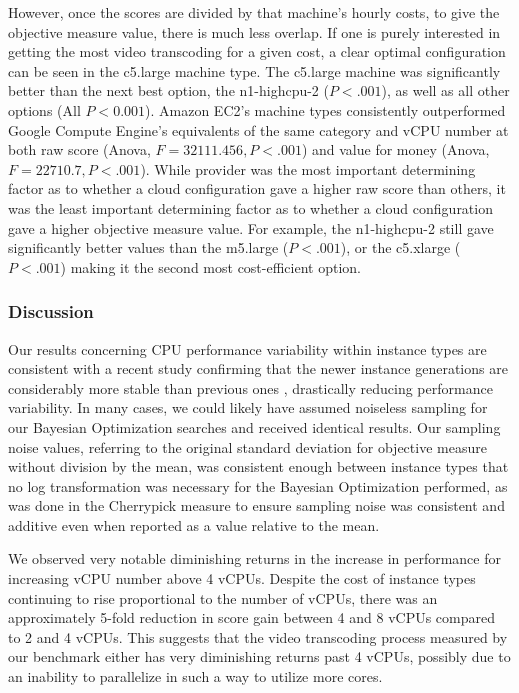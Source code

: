 \documentclass{report}
\begin{document}
However, once the scores are divided by that machine's hourly costs, to give the objective measure value, there is much less overlap. If one is purely interested in getting the most video transcoding for a given cost, a clear optimal configuration can be seen in the c5.large machine type. The c5.large machine was significantly better than the next best option, the n1-highcpu-2 ($P < .001$), as well as all other options (All $P < 0.001$). Amazon EC2's  machine types consistently outperformed Google Compute Engine's equivalents of the same category and vCPU number at both raw score (Anova, $F = 32111.456, P < .001$) and value for money (Anova, $F = 22710.7, P < .001$). While provider was the most important determining factor as to whether a cloud configuration gave a higher raw score than others, it was the least important determining factor as to whether a cloud configuration gave a higher objective measure value. For example, the n1-highcpu-2 still gave significantly better values than the m5.large ($P < .001$), or the c5.xlarge ($P < .001$) making it the second most cost-efficient option. 


\subsubsection{Discussion}
Our results concerning CPU performance variability within instance types are consistent with a recent study \cite{Scheuner2018} confirming that the newer instance generations are considerably more stable than previous ones \cite{Leitner2014}, drastically reducing performance variability. In many cases, we could likely have assumed noiseless sampling for our Bayesian Optimization searches and received identical results. Our sampling noise values, referring to the original standard deviation for objective measure without division by the mean, was consistent enough between instance types that no log transformation was necessary for the Bayesian Optimization performed, as was done in the Cherrypick measure to ensure sampling noise was consistent and additive even when reported as a value relative to the mean\cite{Alipourfard2017}.

We observed very notable diminishing returns in the increase in performance for increasing vCPU number above 4 vCPUs. Despite the cost of instance types continuing to rise proportional to the number of vCPUs, there was an approximately 5-fold reduction in score gain between 4 and 8 vCPUs compared to 2 and 4 vCPUs. This suggests that the video transcoding process measured by our benchmark either has very diminishing returns past 4 vCPUs, possibly due to an inability to parallelize in such a way to utilize more cores.
\end{document}
